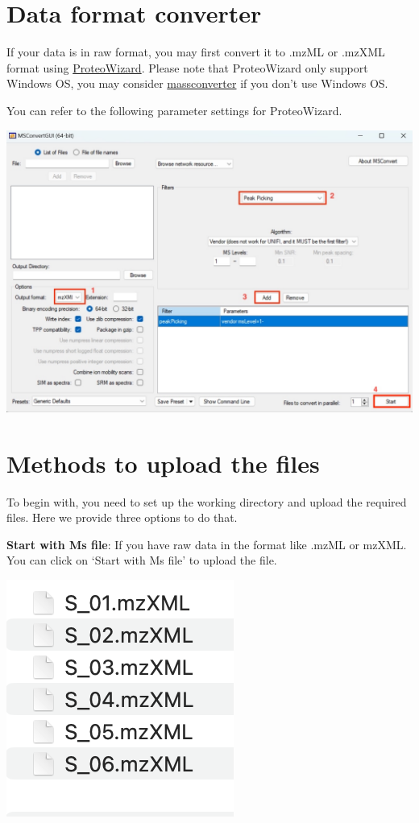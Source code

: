 \documentclass[
]{book}
\begin{document}
\section{Data format converter}\label{data-format-converter}

If your data is in raw format, you may first convert it to .mzML or .mzXML format using \href{https://proteowizard.sourceforge.io}{ProteoWizard}. Please note that ProteoWizard only support Windows OS, you may consider \href{https://massconverter.tidymass.org}{massconverter} if you don't use Windows OS.

You can refer to the following parameter settings for ProteoWizard.

\includegraphics{figures/ProteoWizard.png}

\section{Methods to upload the files}\label{methods-to-upload-the-files}

To begin with, you need to set up the working directory and upload the required files. Here we provide three options to do that.

\textbf{Start with Ms file}:
If you have raw data in the format like .mzML or mzXML. You can click on `Start with Ms file' to upload the file.

\includegraphics{figures/mzXML.png}
\end{document}

